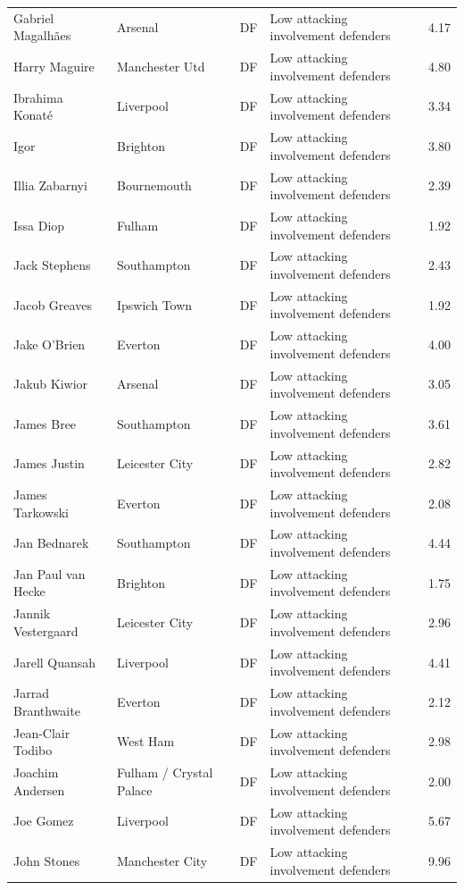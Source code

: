 \begin{longtable}{p{3.4cm}p{2.5cm}p{1.0cm}p{5.0cm}r}
Gabriel Magalhães & Arsenal & DF & Low attacking involvement defenders & 4.17 \\
Harry Maguire & Manchester Utd & DF & Low attacking involvement defenders & 4.80 \\
Ibrahima Konaté & Liverpool & DF & Low attacking involvement defenders & 3.34 \\
Igor & Brighton & DF & Low attacking involvement defenders & 3.80 \\
Illia Zabarnyi & Bournemouth & DF & Low attacking involvement defenders & 2.39 \\
Issa Diop & Fulham & DF & Low attacking involvement defenders & 1.92 \\
Jack Stephens & Southampton & DF & Low attacking involvement defenders & 2.43 \\
Jacob Greaves & Ipswich Town & DF & Low attacking involvement defenders & 1.92 \\
Jake O'Brien & Everton & DF & Low attacking involvement defenders & 4.00 \\
Jakub Kiwior & Arsenal & DF & Low attacking involvement defenders & 3.05 \\
James Bree & Southampton & DF & Low attacking involvement defenders & 3.61 \\
James Justin & Leicester City & DF & Low attacking involvement defenders & 2.82 \\
James Tarkowski & Everton & DF & Low attacking involvement defenders & 2.08 \\
Jan Bednarek & Southampton & DF & Low attacking involvement defenders & 4.44 \\
Jan Paul van Hecke & Brighton & DF & Low attacking involvement defenders & 1.75 \\
Jannik Vestergaard & Leicester City & DF & Low attacking involvement defenders & 2.96 \\
Jarell Quansah & Liverpool & DF & Low attacking involvement defenders & 4.41 \\
Jarrad Branthwaite & Everton & DF & Low attacking involvement defenders & 2.12 \\
Jean-Clair Todibo & West Ham & DF & Low attacking involvement defenders & 2.98 \\
Joachim Andersen & Fulham / Crystal Palace & DF & Low attacking involvement defenders & 2.00 \\
Joe Gomez & Liverpool & DF & Low attacking involvement defenders & 5.67 \\
John Stones & Manchester City & DF & Low attacking involvement defenders & 9.96 \\

\end{longtable}
